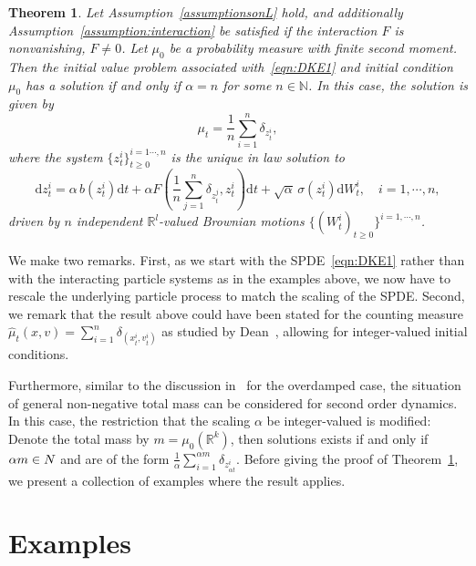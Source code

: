 \documentclass{article}
\newcommand{\dd}{\text{d}}
\newtheorem{theorem}{Theorem}[section]
\newcommand{\R}{\mathbb{R}}
\newcommand{\N}{\mathbb{N}}
\newcommand{\F}{F}
\begin{document}
\begin{theorem}
  \label{thm:mainthm}
  Let Assumption~\ref{assumptionsonL} hold, and additionally Assumption~\ref{assumption:interaction} be
  satisfied if the interaction $\F$ is nonvanishing, $\F\ne 0$. Let $\mu_0$ be a probability measure with
  finite second moment. Then the initial value problem associated with~\eqref{eqn:DKE1} and initial condition
  $\mu_0$ has a solution if and only if $\alpha = n$ for some $n\in \N$.  In this case, the solution is given
  by
  \begin{equation*}
    \mu_t = \frac{1}{n} \sum_{i =1}^n \delta_{z_ t^i}, 
  \end{equation*}
 where the system $ \{z_t^i\}_{t\geq 0}^{i=1\cdots, n}$ is the unique in law solution to
  \begin{equation*}
    \dd z_t^i = \alpha \, b(z^i_t) \dd t  + \alpha \F\left(\frac 1 n
      \sum_{j=1}^n\delta_{z_t^{j}},z^i_t\right) \dd t + \sqrt {\alpha}\, \sigma(z^i_t) \dd W^i_t , \quad i = 1, \cdots ,n,
  \end{equation*}
  driven by $n$ independent $\R^l$-valued Brownian motions $\{(W^i_t)_{t\geq 0}\}^{i= 1, \cdots, n}$.
  \label{theo:main}
\end{theorem}
We make two remarks. First, as we start with the SPDE~\eqref{eqn:DKE1} rather than with the interacting
particle systems as in the examples above, we now have to rescale the underlying particle process to match the
scaling of the SPDE.  Second, we remark that the result above could have been stated for the counting measure
$\hat\mu_t(x,v) = \sum_{i=1}^n \delta_{(x_t^i, v_t^i)}$ as studied by Dean~\cite{Dean1996a}, allowing for
integer-valued initial conditions.

Furthermore, similar to the discussion in~\cite{Konarovskyi2020a, Konarovskyi2024a} for the overdamped case,
the situation of general non-negative total mass can be considered for second order dynamics. In this case,
the restriction that the scaling $\alpha$ be integer-valued is modified: Denote the total mass by
$m= \mu_0(\R^k)$, then solutions exists if and only if $\alpha m \in \mathbb \N $ and are of the form
$\frac{1}{\alpha} \sum_{i = 1}^{\alpha m} \delta_{z_{\alpha t}^i}$.
Before giving the proof of Theorem~\ref{thm:mainthm}, we present a collection of examples where the result
applies.


\section{Examples}
\label{sec:examples}
\end{document}
